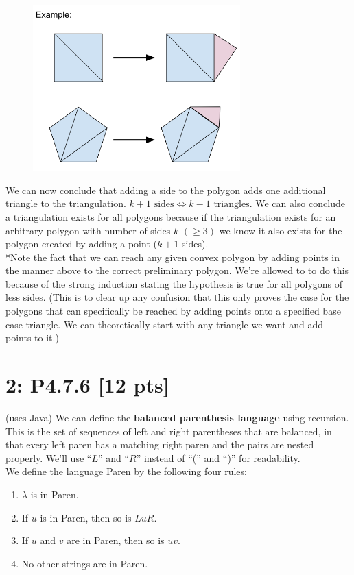 \documentclass[12pt]{article}
\begin{document}
\begin{figure}[h]
\includegraphics[width=8cm]{drawing}
\centering
\end{figure}

We can now conclude that adding a side to the polygon adds one additional triangle to the triangulation. $k+1 \text{ sides} \iff k-1 \text{ triangles}$. We can also conclude a triangulation exists for all polygons because if the triangulation exists for an arbitrary polygon with number of sides $k$ $(\geq 3)$ we know it also exists for the polygon created by adding a point ($k+1$ sides).\\

*Note the fact that we can reach any given convex polygon by adding points in the manner above to the correct preliminary polygon. We're allowed to to do this because of the strong induction stating the hypothesis is true for all polygons of less sides. (This is to clear up any confusion that this only proves the case for the polygons that can specifically be reached by adding points onto a specified base case triangle. We can theoretically start with any triangle we want and add points to it.)


\newpage
\section*{\textbf{2: P4.7.6} [12 pts]}
(uses Java) We can define the \textbf{balanced parenthesis language} using recursion. This is the set of sequences of left and right parentheses that are balanced, in that every left paren has a matching right paren and the pairs are nested properly. We’ll use “$L$” and “$R$” instead of “(” and “)” for readability. \\
We define the language Paren by the following four rules:

\begin{enumerate}
    \item $\lambda$ is in Paren.

    \item If $u$ is in Paren, then so is $LuR$.

    \item If $u$ and $v$ are in Paren, then so is $uv$.

    \item No other strings are in Paren.
\end{enumerate}
\end{document}
